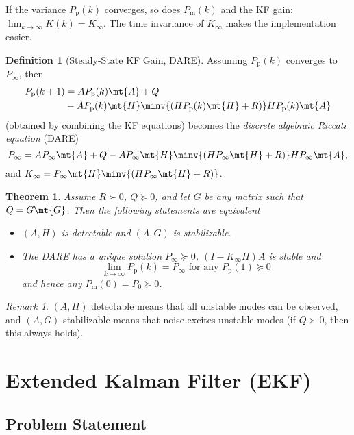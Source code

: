 \documentclass[margin=tiny]{hsrzf}
\theoremstyle{plain}
\newtheorem{thm}{Theorem}[section]
\theoremstyle{definition}
\newtheorem{defn}{Definition}[section]
\theoremstyle{remark}
\newtheorem*{remark}{Remark}
\begin{document}
If the variance $P_\mathrm{p}(k)$ converges, so does $P_\mathrm{m}(k)$ and the
KF gain: $\lim_{k\to\infty} K(k) = K_\infty$. The time invariance of
$K_\infty$ makes the implementation easier.

\begin{defn}[Steady-State KF Gain, DARE]
  Assuming $P_\mathrm{p}(k)$ converges to $P_\infty$, then
  \begin{align*}
    P_\mathrm{p}(k+1) &= A P_\mathrm{p}(k) \mt{A} + Q \\
      &- A P_\mathrm{p}(k)
      \mt{H} \minv{( H P_\mathrm{p}(k) \mt{H} + R)} H P_\mathrm{p}(k) \mt{A}
  \end{align*}
  (obtained by combining the KF equations) becomes the \emph{discrete
  algebraic Riccati equation} (DARE)
  \[
    P_\infty = A P_\infty \mt{A} + Q - A P_\infty \mt{H}
      \minv{(H P_\infty \mt{H} + R)} H P_\infty \mt{A},
  \]
  and $K_\infty = P_\infty \mt{H}\minv{(H P_\infty \mt{H} + R)}$.
\end{defn}


\begin{thm}
  Assume $R \succ 0$, $Q \succeq 0$, and let $G$ be any matrix such that $Q =
  G\mt{G}$. Then the following statements are equivalent
  \begin{itemize}
    \item $(A, H)$ is detectable and $(A, G)$ is stabilizable.
    \item The DARE has a unique solution $P_\infty \succeq 0$, $(I - K_\infty
      H)A$ is stable and
      \[
        \lim_{k\to\infty} P_\mathrm{p}(k) = P_\infty
        \text{ for any } P_\mathrm{p}(1) \succeq 0
      \]
      and hence any $P_\mathrm{m}(0) = P_0 \succeq 0$.
  \end{itemize}
\end{thm}

\begin{remark}
  $(A,H)$ detectable means that all unstable modes can be observed, and
  $(A,G)$ stabilizable means that noise excites unstable modes (if $Q \succ 0$, then
  this always holds).
\end{remark}

\section{Extended Kalman Filter (EKF)}

\subsection{Problem Statement}
\end{document}
